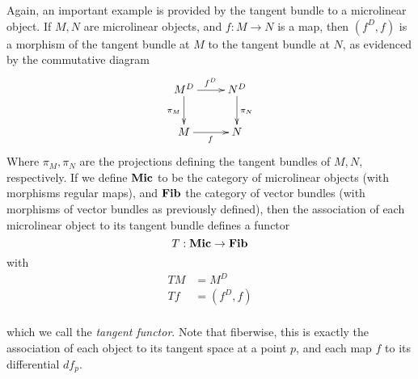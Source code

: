 Again, an important example is provided by the tangent bundle to a microlinear object. If \( M,N \) are microlinear objects, and \( f:M\to N \) is a map, then \( (f^D,f) \) is a morphism of the tangent bundle at \( M \) to the tangent bundle at \( N \), as evidenced by the commutative diagram
\begin{equation*}
  \xymatrix{
    M^D \ar[d]_{\pi_M} \ar[r]^{f^D} & N^D \ar[d]^{\pi_N} \\
    M                  \ar[r]_f     & N
  }
\end{equation*}
Where \( \pi_M,\pi_N \) are the projections defining the tangent bundles of \( M,N \), respectively. If we define \( \mathbf{Mic} \) to be the category of microlinear objects (with morphisms regular maps), and \( \mathbf{Fib} \) the category of vector bundles (with morphisms of vector bundles as previously defined), then the association of each microlinear object to its tangent bundle defines a functor
\begin{equation*}
  T:\mathbf{Mic}\to\mathbf{Fib}
\end{equation*}
with
\begin{align*}
  TM &= M^D     \\
  Tf &= (f^D,f) \\
\end{align*}

which we call the \emph{tangent functor}. Note that fiberwise, this is exactly the association of each object to its tangent space at a point \( p \), and each map \( f \) to its differential \( df_p \).

